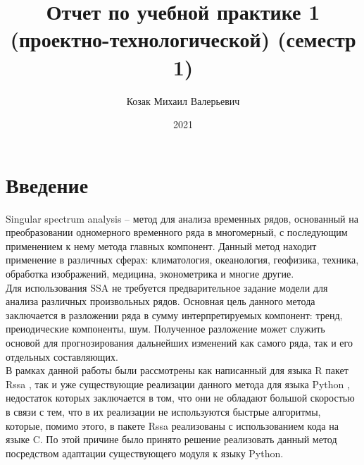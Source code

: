 \documentclass[specialist,
			   substylefile = spbu_report.rtx,
			   subf,href,colorlinks=true, 12pt]{disser}
\begin{document}
%
%

\title{Отчет по учебной практике 1 (проектно-технологической) (семестр 1)}


\author{Козак Михаил Валерьевич}


\date{2021}

\maketitle

\tableofcontents

\chapter{Введение}

Singular spectrum analysis \cite{ssa-method} – метод для анализа временных рядов, основанный на преобразовании одномерного временного ряда в многомерный, с последующим применением к нему метода главных компонент. Данный метод находит применение в различных сферах: климатология, океанология, геофизика, техника, обработка изображений, медицина, эконометрика и многие другие. \\

Для использования SSA не требуется предварительное задание модели для анализа различных произвольных рядов. Основная цель данного метода заключается в разложении ряда в сумму интерпретируемых компонент: тренд, преиодические компоненты, шум. Полученное разложение может служить основой для  прогнозирования дальнейших изменений как самого ряда, так и его отдельных составляющих.\\

В рамках данной работы были рассмотрены как написанный для языка R пакет Rssa \cite{rssa-book, rssa-doc}, так и уже существующие реализации данного метода для языка Python \cite{pyts-doc, kaggle-ssa-doc, git-kieferc-doc}, недостаток которых заключается в том, что они не обладают большой скоростью в связи с тем, что в их реализации не используются быстрые алгоритмы, которые, помимо этого, в пакете Rssa реализованы с использованием кода на языке C. По этой причине было принято решение реализовать данный метод посредством адаптации существующего модуля к языку Python. \\
\end{document}
